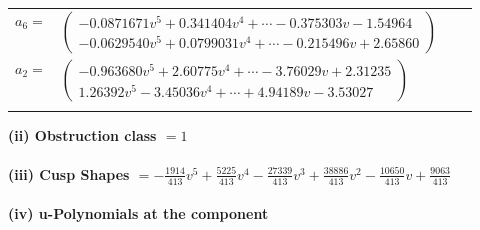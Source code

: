 \documentclass[1p]{elsarticle_modified}
\theoremstyle{definition}
\begin{document}
\begin{tabular}{m{7pt} m{180pt} m{7pt} m{180pt} }
\flushright $a_{6}=$&$\begin{pmatrix}-0.0871671 v^{5}+0.341404 v^{4}+\cdots-0.375303 v-1.54964\\-0.0629540 v^{5}+0.0799031 v^{4}+\cdots-0.215496 v+2.65860\end{pmatrix}$ \\
\flushright $a_{2}=$&$\begin{pmatrix}-0.963680 v^{5}+2.60775 v^{4}+\cdots-3.76029 v+2.31235\\1.26392 v^{5}-3.45036 v^{4}+\cdots+4.94189 v-3.53027\end{pmatrix}$\\&\end{tabular}
\flushleft \textbf{(ii) Obstruction class $= 1$}\\~\\
\flushleft \textbf{(iii) Cusp Shapes $= -\frac{1914}{413} v^5+\frac{5225}{413} v^4-\frac{27339}{413} v^3+\frac{38886}{413} v^2-\frac{10650}{413} v+\frac{9063}{413}$}\\~\\
\newpage\renewcommand{\arraystretch}{1}
\flushleft \textbf{(iv) u-Polynomials at the component}\newline \\
\end{document}
